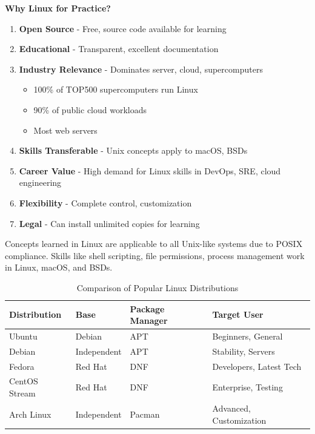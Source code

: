 \textbf{Why Linux for Practice?}

\begin{enumerate}
    \item \textbf{Open Source} - Free, source code available for learning
    \item \textbf{Educational} - Transparent, excellent documentation
    \item \textbf{Industry Relevance} - Dominates server, cloud, supercomputers
    \begin{itemize}
        \item 100\% of TOP500 supercomputers run Linux
        \item 90\% of public cloud workloads
        \item Most web servers
    \end{itemize}
    \item \textbf{Skills Transferable} - Unix concepts apply to macOS, BSDs
    \item \textbf{Career Value} - High demand for Linux skills in DevOps, SRE, cloud engineering
    \item \textbf{Flexibility} - Complete control, customization
    \item \textbf{Legal} - Can install unlimited copies for learning
\end{enumerate}

\begin{notebox}
Concepts learned in Linux are applicable to all Unix-like systems due to POSIX compliance. Skills like shell scripting, file permissions, process management work in Linux, macOS, and BSDs.
\end{notebox}

\begin{table}[htbp]
    \centering
    \caption{Comparison of Popular Linux Distributions}
    \label{tab:linux-distros}
    \begin{tabular}{@{}llll@{}}
        \toprule
        \textbf{Distribution} & \textbf{Base} & \textbf{Package Manager} & \textbf{Target User} \\
        \midrule
        Ubuntu & Debian & APT & Beginners, General \\
        Debian & Independent & APT & Stability, Servers \\
        Fedora & Red Hat & DNF & Developers, Latest Tech \\
        CentOS Stream & Red Hat & DNF & Enterprise, Testing \\
        Arch Linux & Independent & Pacman & Advanced, Customization \\
        \bottomrule
    \end{tabular}
\end{table}

